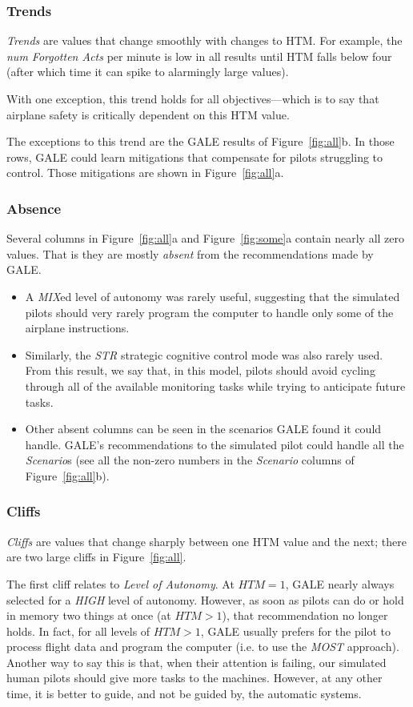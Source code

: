 \documentclass[journal]{IEEEtran}
\newcommand{\bi}{\begin{itemize}}
\newcommand{\ei}{\end{itemize}}
\newcommand{\fig}[1]{Figure~\ref{fig:#1}}
\newcommand{\ADD}[1]{#1}
\begin{document}
\subsubsection{Trends}

{\em Trends} are  values that change  smoothly with changes to HTM. For example, the  {\em num Forgotten Acts} per minute is low in all results until HTM falls below four (after which time it can spike to alarmingly large values). 

With one exception, this trend holds for all objectives---which is to say that airplane safety is critically dependent on this HTM value.

The exceptions to this trend are the GALE results of \fig{all}b.  
In those rows, GALE could learn mitigations that compensate for pilots struggling to control. 
Those mitigations are shown in \fig{all}a. 
 

\subsubsection{Absence}

Several columns in \fig{all}a and \fig{some}a contain nearly all zero values. That is they are mostly {\em absent} from the recommendations made by GALE.

\bi
\item
A {\em MIX}ed level of autonomy was rarely useful, suggesting that the simulated pilots should very rarely program the computer to handle only some of the airplane instructions.
\item
Similarly, the {\em STR} strategic cognitive control mode was also rarely used.
From this result, we say that, in this model, pilots should avoid cycling through all of the available monitoring tasks while trying to anticipate future tasks.
\item Other absent columns can be seen in the scenarios GALE found it could handle. 
GALE's recommendations to the simulated pilot could handle all the {\em Scenario}s (see all the non-zero numbers in the {\em Scenario} columns of \fig{all}b).
\ei


\subsubsection{Cliffs}

{\em Cliffs} are values that change sharply between one HTM value and the next; there are two large cliffs in \fig{all}.

The first cliff relates to {\em Level of Autonomy}. 
At $\mathit{HTM}=1$, GALE nearly always selected for a {\em HIGH} level of autonomy. 
However, as soon as pilots can do or hold in memory two things at once (at $\mathit{HTM}>1$), that recommendation no longer holds.  
In fact, for all levels of $\mathit{HTM}>1$, GALE usually prefers for the pilot to process flight data and program the computer (i.e. to use the {\em MOST} approach).
\ADD{Another way to say this is that, when their attention is failing, our simulated human pilots should give more tasks to the machines.}
However, at any other time, it is better to guide, and not be guided by, the automatic systems.
\end{document}

